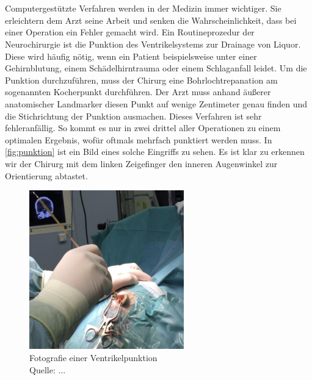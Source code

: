 \chapter{}
\label{sec:Introduction}



Computergestützte Verfahren werden in der Medizin immer wichtiger. Sie erleichtern dem Arzt seine Arbeit und senken die Wahrscheinlichkeit, dass bei einer Operation ein Fehler gemacht wird.
\newline
Ein Routineprozedur der Neurochirurgie ist die Punktion des Ventrikelsystems zur Drainage von Liquor. Diese wird häufig nötig, wenn ein Patient beispielsweise unter einer Gehirnblutung, einem Schädelhirntrauma oder einem Schlaganfall leidet. Um die Punktion durchzuführen, muss der Chirurg eine Bohrlochtrepanation am sogenannten Kocherpunkt durchführen. Der Arzt muss anhand äußerer anatomischer Landmarker diesen Punkt auf wenige Zentimeter genau finden und die Stichrichtung der Punktion ausmachen. Dieses Verfahren ist sehr fehleranfällig. So kommt es nur in zwei drittel aller Operationen zu einem optimalen Ergebnis, wofür oftmals mehrfach punktiert werden muss. In \autoref{fig:punktion} ist ein Bild eines solche Eingriffs zu sehen. Es ist klar zu erkennen wir der Chirurg mit dem linken Zeigefinger den inneren Augenwinkel zur Orientierung abtastet.


\begin{figure}[!h] 
\centering 
\includegraphics[width=0.6\textwidth]{Logos/Punktion2.png}
\caption{Fotografie einer Ventrikelpunktion  \\Quelle: ...} 
\label{fig:punktion} 
\end{figure}


